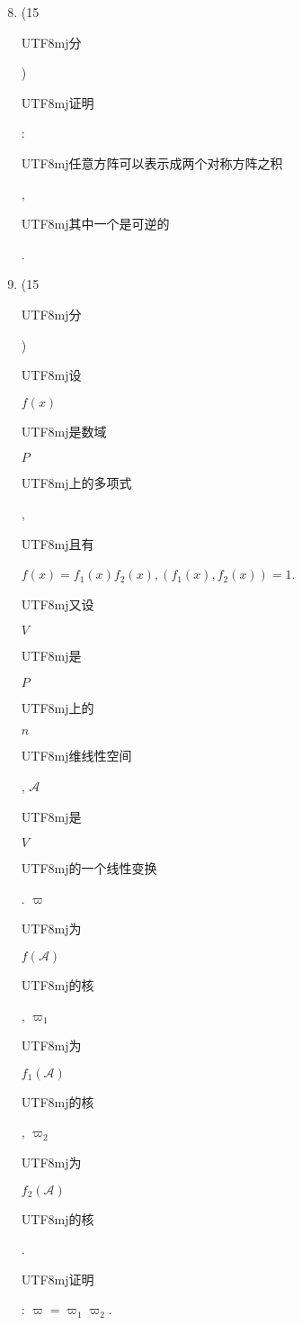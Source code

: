 \documentclass[10pt]{article}
\begin{document}
\begin{enumerate}
  \setcounter{enumi}{7}
  \item (15 \begin{CJK}{UTF8}{mj}分\end{CJK}) \begin{CJK}{UTF8}{mj}证明\end{CJK}: \begin{CJK}{UTF8}{mj}任意方阵可以表示成两个对称方阵之积\end{CJK}, \begin{CJK}{UTF8}{mj}其中一个是可逆的\end{CJK}.

  \item (15 \begin{CJK}{UTF8}{mj}分\end{CJK}) \begin{CJK}{UTF8}{mj}设\end{CJK} $f(x)$ \begin{CJK}{UTF8}{mj}是数域\end{CJK} $P$ \begin{CJK}{UTF8}{mj}上的多项式\end{CJK}, \begin{CJK}{UTF8}{mj}且有\end{CJK} $f(x)=f_{1}(x) f_{2}(x),\left(f_{1}(x), f_{2}(x)\right)=1$. \begin{CJK}{UTF8}{mj}又设\end{CJK} $V$ \begin{CJK}{UTF8}{mj}是\end{CJK} $P$ \begin{CJK}{UTF8}{mj}上的\end{CJK} $n$ \begin{CJK}{UTF8}{mj}维线性空间\end{CJK}, $\mathscr{A}$ \begin{CJK}{UTF8}{mj}是\end{CJK} $V$ \begin{CJK}{UTF8}{mj}的一个线性变换\end{CJK}. $\varpi$ \begin{CJK}{UTF8}{mj}为\end{CJK} $f(\mathscr{A})$ \begin{CJK}{UTF8}{mj}的核\end{CJK}, $\varpi_{1}$ \begin{CJK}{UTF8}{mj}为\end{CJK} $f_{1}(\mathscr{A})$ \begin{CJK}{UTF8}{mj}的核\end{CJK}, $\varpi_{2}$ \begin{CJK}{UTF8}{mj}为\end{CJK} $f_{2}(\mathscr{A})$ \begin{CJK}{UTF8}{mj}的核\end{CJK}. \begin{CJK}{UTF8}{mj}证明\end{CJK}: $\varpi=\varpi_{1} \varpi_{2}$.


\end{enumerate}
\end{document}
